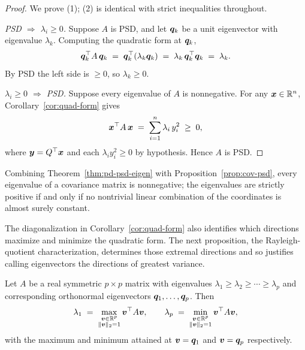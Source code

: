 \begin{proof}
We prove (1); (2) is identical with strict inequalities throughout.

\emph{PSD \(\Rightarrow\) \(\lambda_i \ge 0\).} Suppose \(A\) is PSD, and let \(\bm{q}_k\) be a unit eigenvector with eigenvalue \(\lambda_k\). Computing the quadratic form at \(\bm{q}_k\),
\[
  \bm{q}_k^{\top} A\, \bm{q}_k \;=\; \bm{q}_k^{\top} (\lambda_k \bm{q}_k) \;=\; \lambda_k\, \bm{q}_k^{\top} \bm{q}_k \;=\; \lambda_k.
\]
By PSD the left side is \(\ge 0\), so \(\lambda_k \ge 0\).

\emph{\(\lambda_i \ge 0\) \(\Rightarrow\) PSD.} Suppose every eigenvalue of \(A\) is nonnegative. For any \(\bm{x} \in \mathbb{R}^n\), Corollary~\ref{cor:quad-form} gives
\[
  \bm{x}^{\top} A\, \bm{x} \;=\; \sum_{i=1}^n \lambda_i\, y_i^2 \;\ge\; 0,
\]
where \(\bm{y} = Q^{\top} \bm{x}\) and each \(\lambda_i y_i^2 \ge 0\) by hypothesis. Hence \(A\) is PSD.
\end{proof}

Combining Theorem~\ref{thm:pd-psd-eigen} with Proposition~\ref{prop:cov-psd}, every eigenvalue of a covariance matrix is nonnegative; the eigenvalues are strictly positive if and only if no nontrivial linear combination of the coordinates is almost surely constant.

The diagonalization in Corollary~\ref{cor:quad-form} also identifies which directions maximize and minimize the quadratic form. The next proposition, the Rayleigh-quotient characterization, determines those extremal directions and so justifies calling eigenvectors the directions of greatest variance.

\begin{proposition}\label{prop:rayleigh}
Let \(A\) be a real symmetric \(p \times p\) matrix with eigenvalues \(\lambda_1 \ge \lambda_2 \ge \cdots \ge \lambda_p\) and corresponding orthonormal eigenvectors \(\bm{q}_1, \ldots, \bm{q}_p\). Then
\[
  \lambda_1 \;=\; \max_{\substack{\bm{v} \in \mathbb{R}^p \\ \lVert\bm{v}\rVert_2 = 1}} \bm{v}^{\top} A \bm{v}, \qquad \lambda_p \;=\; \min_{\substack{\bm{v} \in \mathbb{R}^p \\ \lVert\bm{v}\rVert_2 = 1}} \bm{v}^{\top} A \bm{v},
\]
with the maximum and minimum attained at \(\bm{v} = \bm{q}_1\) and \(\bm{v} = \bm{q}_p\) respectively.
\end{proposition}

